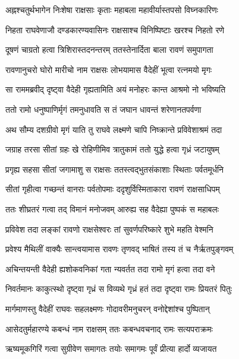 \twolineshloka
{अह्नश्चतुर्थभागेन निःशेषा राक्षसाः कृताः}
{महाबला महावीर्यास्तपसो विघ्नकारिणः} %

\twolineshloka
{निहता राघवेणाजौ दण्डकारण्यवासिनः}
{राक्षसाश्च विनिष्पिष्टाः खरश्च निहतो रणे} %

\twolineshloka
{दूषणं चाग्रतो हत्वा त्रिशिरास्तदनन्तरम्}
{ततस्तेनार्दिता बाला रावणं समुपागता} %

\twolineshloka
{रावणानुचरो घोरो मारीचो नाम राक्षसः}
{लोभयामास वैदेहीं भूत्वा रत्नमयो मृगः} %

\twolineshloka
{सा राममब्रवीद् दृष्ट्वा वैदेही गृह्यतामिति}
{अयं मनोहरः कान्त आश्रमो नो भविष्यति} %

\twolineshloka
{ततो रामो धनुष्पाणिर्मृगं तमनुधावति}
{स तं जघान धावन्तं शरेणानतपर्वणा} %

\twolineshloka
{अथ सौम्य दशग्रीवो मृगं याति तु राघवे}
{लक्ष्मणे चापि निष्क्रान्ते प्रविवेशाश्रमं तदा} %

\twolineshloka
{जग्राह तरसा सीतां ग्रहः खे रोहिणीमिव}
{त्रातुकामं ततो युद्धे हत्वा गृध्रं जटायुषम्} %

\twolineshloka
{प्रगृह्य सहसा सीतां जगामाशु स राक्षसः}
{ततस्त्वद्भुतसंकाशाः स्थिताः पर्वतमूर्धनि} %

\twolineshloka
{सीतां गृहीत्वा गच्छन्तं वानराः पर्वतोपमाः}
{ददृशुर्विस्मिताकारा रावणं राक्षसाधिपम्} %

\twolineshloka
{ततः शीघ्रतरं गत्वा तद् विमानं मनोजवम्}
{आरुह्य सह वैदेह्या पुष्पकं स महाबलः} %

\twolineshloka
{प्रविवेश तदा लङ्कां रावणो राक्षसेश्वरः}
{तां सुवर्णपरिष्कारे शुभे महति वेश्मनि} %

\twolineshloka
{प्रवेश्य मैथिलीं वाक्यैः सान्त्वयामास रावणः}
{तृणवद् भाषितं तस्य तं च नैर्ऋतपुङ्गवम्} %

\twolineshloka
{अचिन्तयन्ती वैदेही ह्यशोकवनिकां गता}
{न्यवर्तत तदा रामो मृगं हत्वा तदा वने} %

\twolineshloka
{निवर्तमानः काकुत्स्थो दृष्ट्वा गृध्रं स विव्यथे}
{गृध्रं हतं तदा दृष्ट्वा रामः प्रियतरं पितुः} %

\twolineshloka
{मार्गमाणस्तु वैदेहीं राघवः सहलक्ष्मणः}
{गोदावरीमनुचरन् वनोद्देशांश्च पुष्पितान्} %

\twolineshloka
{आसेदतुर्महारण्ये कबन्धं नाम राक्षसम्}
{ततः कबन्धवचनाद् रामः सत्यपराक्रमः} %

\twolineshloka
{ऋष्यमूकगिरिं गत्वा सुग्रीवेण समागतः}
{तयोः समागमः पूर्वं प्रीत्या हार्दो व्यजायत} %

